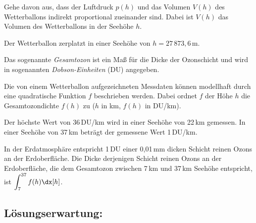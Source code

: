 \begin{langesbeispiel}
\begin{aufgabenstellung}
Gehe davon aus, dass der Luftdruck $p(h)$ und das Volumen $V(h)$ des Wetterballons indirekt proportional zueinander sind. Dabei ist $V(h)$ das Volumen des Wetterballons in der Seehöhe $h$.%


Der Wetterballon zerplatzt in einer Seehöhe von $h=27\,873,6$\,m.


\item Das sogenannte \textit{Gesamtozon} ist ein Maß für die Dicke der Ozonschicht und wird in sogenannten \textit{Dobson-Einheiten} (DU) angegeben.

Die von einem Wetterballon aufgezeichneten Messdaten können modellhaft durch eine quadratische Funktion $f$ beschrieben werden. Dabei ordnet $f$ der Höhe $h$ die Gesamtozondichte $f(h)$ zu ($h$ in km, $f(h)$ in DU/km).

Der höchste Wert von 36\,DU/km wird in einer Seehöhe von 22\,km gemessen. In einer Seehöhe von 37\,km beträgt der gemessene Wert 1\,DU/km.%


In der Erdatmosphäre entspricht 1\,DU einer 0,01\,mm dicken Schicht reinen Ozons an der Erdoberfläche. Die Dicke derjenigen Schicht reinen Ozons an der Erdoberfläche, die dem Gesamtozon zwischen 7\,km und 37\,km Seehöhe entspricht, ist $\displaystyle\int^{37}_7 f(h)\dx[h]$.


\end{aufgabenstellung}

\begin{loesung}
\item \subsection{Lösungserwartung:} 


\end{loesung}
\end{langesbeispiel}
